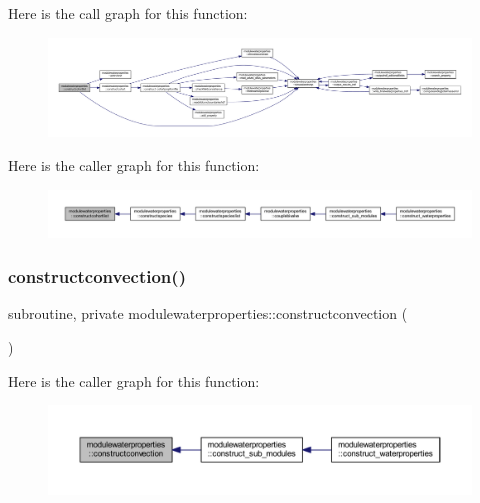 Here is the call graph for this function\+:\nopagebreak
\begin{figure}[H]
\begin{center}
\leavevmode
\includegraphics[width=350pt]{namespacemodulewaterproperties_abc72b5ed3f87133ad8c1dfd787c6eee5_cgraph}
\end{center}
\end{figure}
Here is the caller graph for this function\+:\nopagebreak
\begin{figure}[H]
\begin{center}
\leavevmode
\includegraphics[width=350pt]{namespacemodulewaterproperties_abc72b5ed3f87133ad8c1dfd787c6eee5_icgraph}
\end{center}
\end{figure}
\mbox{\label{namespacemodulewaterproperties_ad8de5e881e7e755e1d5eaa908ad599eb}} 
\subsubsection{\texorpdfstring{constructconvection()}{constructconvection()}}
{\footnotesize\ttfamily subroutine, private modulewaterproperties\+::constructconvection (\begin{DoxyParamCaption}{ }\end{DoxyParamCaption})\hspace{0.3cm}{\ttfamily [private]}}

Here is the caller graph for this function\+:\nopagebreak
\begin{figure}[H]
\begin{center}
\leavevmode
\includegraphics[width=350pt]{namespacemodulewaterproperties_ad8de5e881e7e755e1d5eaa908ad599eb_icgraph}
\end{center}
\end{figure}
\mbox{\label{namespacemodulewaterproperties_aea1140bf6cb4f7e78048a1a4a434435d}} 
